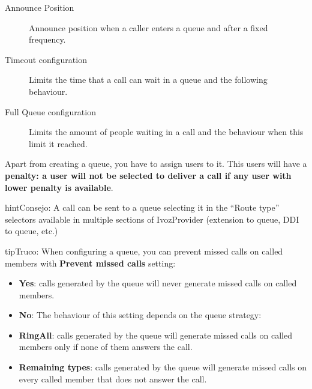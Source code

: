 \documentclass[letterpaper,10pt,spanish]{sphinxmanual}
\begin{document}
\begin{description}
\item[{Announce Position}] \leavevmode{}\label{administration_portal/client/vpbx/routing_endpoints/queues:term-announce-position}
Announce position when a caller enters a queue and after a fixed frequency.

\item[{Timeout configuration}] \leavevmode{}\label{administration_portal/client/vpbx/routing_endpoints/queues:term-timeout-configuration}
Limits the time that a call can wait in a queue and the following behaviour.

\item[{Full Queue configuration}] \leavevmode{}\label{administration_portal/client/vpbx/routing_endpoints/queues:term-full-queue-configuration}
Limits the amount of people waiting in a call and the behaviour when this limit
it reached.

\end{description}

Apart from creating a queue, you have to assign users to it. This users will have
a \textbf{penalty: a user will not be selected to deliver a call if any user with lower
penalty is available}.

\begin{notice}{hint}{Consejo:}
A call can be sent to a queue selecting it in the ``Route type'' selectors
available in multiple sections of IvozProvider (extension to queue, DDI
to queue, etc.)
\end{notice}

\begin{notice}{tip}{Truco:}
When configuring a queue, you can prevent missed calls on called members with \textbf{Prevent missed calls} setting:
\begin{itemize}
\item {} 
\textbf{Yes}: calls generated by the queue will never generate missed calls on called members.

\item {} 
\textbf{No}: The behaviour of this setting depends on the queue strategy:

\item {} 
\textbf{RingAll}: calls generated by the queue will generate missed calls on called members only if none of them answers the call.

\item {} 
\textbf{Remaining types}: calls generated by the queue will generate missed calls on every called member that does not answer the call.

\end{itemize}
\end{notice}
\end{document}
